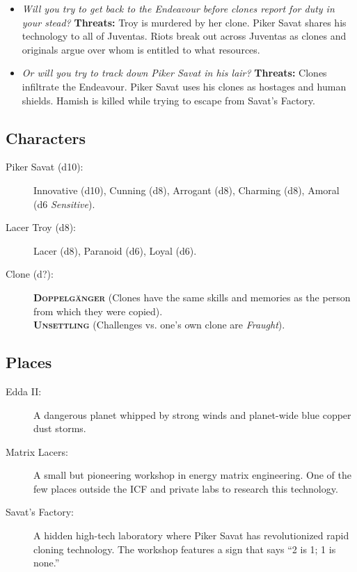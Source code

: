 \documentclass[11pt, a5paper, parskip=half-, DIV=12]{scrartcl}
\begin{document}
\begin{itemize}
	\item \textit{Will you try to get back to the Endeavour before clones report for duty in your stead?} \textbf{Threats:} Troy is murdered by her clone. Piker Savat shares his technology to all of Juventas. Riots break out across Juventas as clones and originals argue over whom is entitled to what resources.
	\item \textit{Or will you try to track down Piker Savat in his lair?} \textbf{Threats:} Clones infiltrate the Endeavour. Piker Savat uses his clones as hostages and human shields. Hamish is killed while trying to escape from Savat's Factory.
\end{itemize}

\newpage

\subsection*{Characters}
\begin{description}
	\item[Piker Savat (d10):] Innovative (d10), Cunning (d8), Arrogant (d8), Charming (d8), Amoral (d6 \textit{Sensitive}).
	\item[Lacer Troy (d8):] Lacer (d8), Paranoid (d6), Loyal (d6).
	\item[Clone (d?):] \textbf{\textsc{Doppelg\"anger}} (Clones have the same skills and memories as the person from which they were copied).\\ \textbf{\textsc{Unsettling}} (Challenges vs. one's own clone are \textit{Fraught}).
\end{description}

\subsection*{Places}
\begin{description}
	\item[Edda II:] A dangerous planet whipped by strong winds and planet-wide blue copper dust storms.
	\item[Matrix Lacers:] A small but pioneering workshop in energy matrix engineering. One of the few places outside the ICF and private labs to research this technology.
	\item[Savat's Factory:] A hidden high-tech laboratory where Piker Savat has revolutionized rapid cloning technology.
	The workshop features a sign that says ``2 is 1; 1 is none.''
\end{description}
\end{document}
